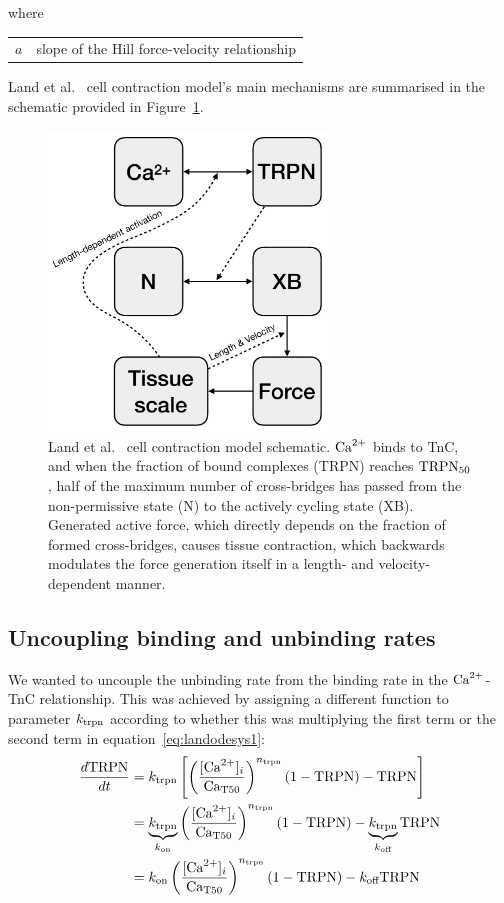 \noindent
where

\vspace{0.2cm}
\begin{tabular}{ll}
    $a$ & slope of the Hill force-velocity relationship
\end{tabular}

\vspace{0.2cm}\noindent
Land et al.~\cite{Land:2012} cell contraction model's main mechanisms are summarised in the schematic provided in Figure~\ref{fig:cellcontrschematic}.

\begin{figure}[ht!]
    \myfloatalign
    \includegraphics[width=0.66\textwidth]{figures/chapter02/cellular_contraction_land.pdf}
    \caption{Land et al.~\cite{Land:2012} cell contraction model schematic. $\textrm{Ca}^{2+}$ binds to TnC, and when the fraction of bound complexes (TRPN) reaches $\textrm{TRPN}_{50}$, half of the maximum number of cross-bridges has passed from the non-permissive state (N) to the actively cycling state (XB). Generated active force, which directly depends on the fraction of formed cross-bridges, causes tissue contraction, which backwards modulates the force generation itself in a length- and velocity-dependent manner.}
    \label{fig:cellcontrschematic}
\end{figure}


%
%
%
\subsection{Uncoupling binding and unbinding rates}\label{sec:ch2uncoupling_binding_and_unbinding_rates}
We wanted to uncouple the unbinding rate from the binding rate in the $\textrm{Ca}^{2+}$-TnC relationship. This was achieved by assigning a different function to parameter $k_{\textrm{trpn}}$ according to whether this was multiplying the first term or the second term in equation~\eqref{eq:landodesys1}:
%
\begin{align}
    \frac{d\text{TRPN}}{dt} &=k_{\textrm{trpn}}\left[\left(\frac{[\textrm{Ca}^{2+}]_{i}}{\textrm{Ca}_{\textrm{T}50}}\right)^{n_{\textrm{trpn}}}(1-\textrm{TRPN})-\textrm{TRPN}\right] \\
    &= \underbrace{k_{\textrm{trpn}}}_{k_{\textrm{on}}}\left(\frac{[\textrm{Ca}^{2+}]_{i}}{\textrm{Ca}_{\textrm{T}50}}\right)^{n_{\textrm{trpn}}}(1-\textrm{TRPN})-\underbrace{k_{\textrm{trpn}}}_{k_{\textrm{off}}}\textrm{TRPN} \\
    &= k_{\textrm{on}}\left(\frac{[\textrm{Ca}^{2+}]_{i}}{\textrm{Ca}_{\textrm{T}50}}\right)^{n_{\textrm{trpn}}}(1-\textrm{TRPN})-k_{\textrm{off}}\textrm{TRPN} \label{eq:landodesys1mod}
\end{align}

